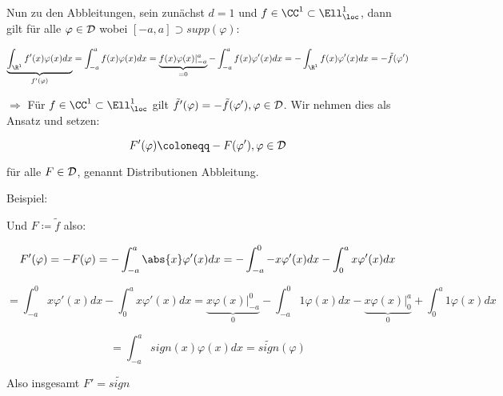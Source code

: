 Nun zu den Abbleitungen, sein zunächst $d=1$ und $f \in \CC^1 \subset \Ell^1_{\loc}$, dann gilt für alle $\varphi \in \mathcal{D}$ wobei $[-a,a] \supset supp(\varphi)$:

\[\underbrace{\int_{\R^1} f'(x) \varphi(x) dx}_{f'(\varphi)} = \int_{-a}^a f(x) \varphi(x) dx = \underbrace{f(x)\varphi(x)|_{-a}^{a}}_{=0} - \int_{-a}^a f(x) \varphi'(x) dx = -\int_{\R^1} f(x) \varphi'(x) dx = -\tilde f(\varphi')\]

$\Rightarrow$ Für $f \in \CC^1 \subset \Ell^1_{\loc}$ gilt $\tilde f'(\varphi) = - \tilde f(\varphi'), \varphi \in \mathcal{D}$. Wir nehmen dies als Ansatz und setzen:

\begin{equation}\label{eq.11.2}
    F'(\varphi) \coloneqq -F(\varphi'), \varphi \in \D
\end{equation}

für alle $F\in \mathcal{D}$, genannt Distributionen Abbleitung.

Beispiel:

\begin{center}
\end{center}
Und $F \coloneqq \tilde f$ also:

\[F'(\varphi) = -F(\varphi) = - \int_{-a}^a \abs{x} \varphi'(x) dx = - \int_{-a}^0 -x \varphi'(x) dx - \int_0^a x \varphi'(x) dx \]

\[= \int_{-a}^0 x \varphi'(x) dx - \int_0^a x \varphi'(x) dx = \underbrace{x \varphi(x)|_{-a}^0}_{0} - \int_{-a}^0 1 \varphi(x) dx - \underbrace{x \varphi(x)|_0^a}_{0} + \int_0^a 1 \varphi(x) dx\]

\[= \int_{-a}^a sign(x) \varphi(x) dx = \tilde{sign}(\varphi)\]

\begin{center}
\end{center}

Also insgesamt $F'=\tilde{sign}$

